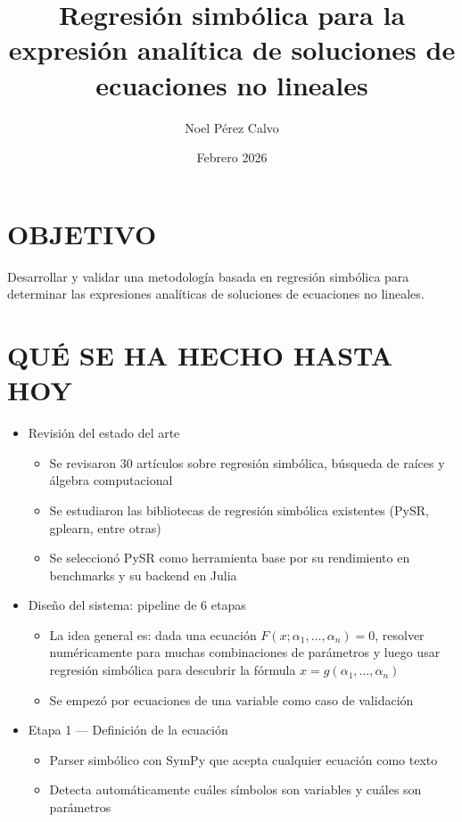 \documentclass[12pt, a4paper]{article}
\title{\textbf{Regresión simbólica para la expresión analítica de soluciones de ecuaciones no lineales}} \author{Noel Pérez Calvo} \date{Febrero 2026}
\begin{document}
\maketitle

\section*{OBJETIVO}

Desarrollar y validar una metodología basada en regresión simbólica para determinar las expresiones analíticas de soluciones de ecuaciones no lineales.

\section*{QUÉ SE HA HECHO HASTA HOY}

\begin{itemize}[leftmargin=1.5em]

  \item Revisión del estado del arte
  \begin{itemize}
\item Se revisaron 30 artículos sobre regresión simbólica, búsqueda de raíces y álgebra computacional \item Se estudiaron las bibliotecas de regresión simbólica existentes (PySR, gplearn, entre otras) \item Se seleccionó PySR como herramienta base por su rendimiento en benchmarks y su backend en Julia
  \end{itemize}

  \item Diseño del sistema: pipeline de 6 etapas
  \begin{itemize}
\item La idea general es: dada una ecuación $F(x; \alpha_1, \ldots, \alpha_n) = 0$, resolver numéricamente para muchas combinaciones de parámetros y luego usar regresión simbólica para descubrir la fórmula $x = g(\alpha_1, \ldots, \alpha_n)$ \item Se empezó por ecuaciones de una variable como caso de validación
  \end{itemize}

  \item Etapa 1 --- Definición de la ecuación
  \begin{itemize}
\item Parser simbólico con SymPy que acepta cualquier ecuación como texto \item Detecta automáticamente cuáles símbolos son variables y cuáles son parámetros
  \end{itemize}


\end{itemize}
\end{document}
